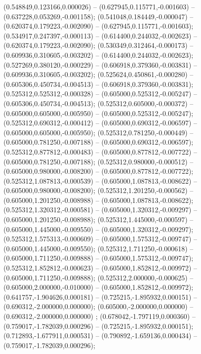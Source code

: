  (0.548849,0.123166,0.000026) -- (0.627945,0.115771,-0.001603) -- (0.637228,0.053269,-0.001158);
 (0.541048,0.184449,-0.000047) -- (0.620374,0.179223,-0.002090) -- (0.627945,0.115771,-0.001603);
 (0.534917,0.247397,-0.000113) -- (0.614400,0.244032,-0.002623) -- (0.620374,0.179223,-0.002090);
 (0.530349,0.312464,-0.000173) -- (0.609936,0.310605,-0.003202) -- (0.614400,0.244032,-0.002623);
 (0.527269,0.380120,-0.000229) -- (0.606918,0.379360,-0.003831) -- (0.609936,0.310605,-0.003202);
 (0.525624,0.450861,-0.000280) -- (0.605306,0.450734,-0.004513) -- (0.606918,0.379360,-0.003831);
 (0.525312,0.525312,-0.000328) -- (0.605000,0.525312,-0.005247) -- (0.605306,0.450734,-0.004513);
 (0.525312,0.605000,-0.000372) -- (0.605000,0.605000,-0.005950) -- (0.605000,0.525312,-0.005247);
 (0.525312,0.690312,-0.000412) -- (0.605000,0.690312,-0.006597) -- (0.605000,0.605000,-0.005950);
 (0.525312,0.781250,-0.000449) -- (0.605000,0.781250,-0.007188) -- (0.605000,0.690312,-0.006597);
 (0.525312,0.877812,-0.000483) -- (0.605000,0.877812,-0.007722) -- (0.605000,0.781250,-0.007188);
 (0.525312,0.980000,-0.000512) -- (0.605000,0.980000,-0.008200) -- (0.605000,0.877812,-0.007722);
 (0.525312,1.087813,-0.000539) -- (0.605000,1.087813,-0.008622) -- (0.605000,0.980000,-0.008200);
 (0.525312,1.201250,-0.000562) -- (0.605000,1.201250,-0.008988) -- (0.605000,1.087813,-0.008622);
 (0.525312,1.320312,-0.000581) -- (0.605000,1.320312,-0.009297) -- (0.605000,1.201250,-0.008988);
 (0.525312,1.445000,-0.000597) -- (0.605000,1.445000,-0.009550) -- (0.605000,1.320312,-0.009297);
 (0.525312,1.575313,-0.000609) -- (0.605000,1.575312,-0.009747) -- (0.605000,1.445000,-0.009550);
 (0.525312,1.711250,-0.000618) -- (0.605000,1.711250,-0.009888) -- (0.605000,1.575312,-0.009747);
 (0.525312,1.852812,-0.000623) -- (0.605000,1.852812,-0.009972) -- (0.605000,1.711250,-0.009888);
 (0.525312,2.000000,-0.000625) -- (0.605000,2.000000,-0.010000) -- (0.605000,1.852812,-0.009972);
 (0.641757,-1.904626,0.000181) -- (0.725215,-1.895932,0.000151) -- (0.690312,-2.000000,0.000000);
 (0.605000,-2.000000,0.000000) -- (0.690312,-2.000000,0.000000) ;
 (0.678042,-1.797119,0.000360) -- (0.759017,-1.782039,0.000296) -- (0.725215,-1.895932,0.000151);
 (0.712893,-1.677911,0.000531) -- (0.790892,-1.659136,0.000434) -- (0.759017,-1.782039,0.000296);
